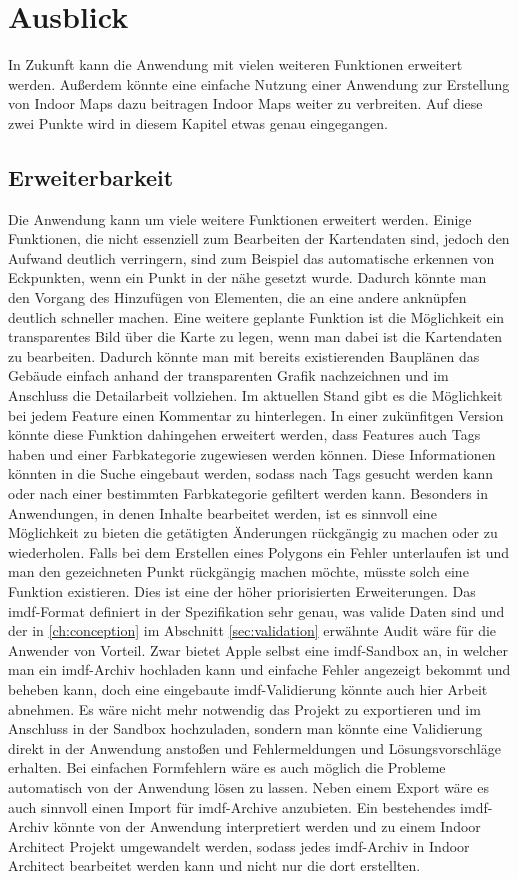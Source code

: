 \section{Ausblick}
In Zukunft kann die Anwendung mit vielen weiteren Funktionen erweitert werden.
Außerdem könnte eine einfache Nutzung einer Anwendung zur Erstellung von Indoor Maps dazu beitragen Indoor Maps weiter zu verbreiten.
Auf diese zwei Punkte wird in diesem Kapitel etwas genau eingegangen.

\subsection{Erweiterbarkeit}
Die Anwendung kann um viele weitere Funktionen erweitert werden.
Einige Funktionen, die nicht essenziell zum Bearbeiten der Kartendaten sind, jedoch den Aufwand deutlich verringern, sind zum Beispiel das automatische erkennen von Eckpunkten, wenn ein Punkt in der nähe gesetzt wurde.
Dadurch könnte man den Vorgang des Hinzufügen von Elementen, die an eine andere anknüpfen deutlich schneller machen.\pbreak
%
Eine weitere geplante Funktion ist die Möglichkeit ein transparentes Bild über die Karte zu legen, wenn man dabei ist die Kartendaten zu bearbeiten.
Dadurch könnte man mit bereits existierenden Bauplänen das Gebäude einfach anhand der transparenten Grafik nachzeichnen und im Anschluss die Detailarbeit vollziehen.\pbreak%
%
Im aktuellen Stand gibt es die Möglichkeit bei jedem Feature einen Kommentar zu hinterlegen.
In einer zukünfitgen Version könnte diese Funktion dahingehen erweitert werden, dass Features auch Tags haben und einer Farbkategorie zugewiesen werden können.
Diese Informationen könnten in die Suche eingebaut werden, sodass nach Tags gesucht werden kann oder nach einer bestimmten Farbkategorie gefiltert werden kann.\pbreak%
%
Besonders in Anwendungen, in denen Inhalte bearbeitet werden, ist es sinnvoll eine Möglichkeit zu bieten die getätigten Änderungen rückgängig zu machen oder zu wiederholen.
Falls bei dem Erstellen eines Polygons ein Fehler unterlaufen ist und man den gezeichneten Punkt rückgängig machen möchte, müsste solch eine Funktion existieren.
Dies ist eine der höher priorisierten Erweiterungen.\pbreak%
%
Das \ac{imdf}-Format definiert in der Spezifikation sehr genau, was valide Daten sind und der in \autoref{ch:conception} im Abschnitt \autoref{sec:validation} erwähnte Audit wäre für die Anwender von Vorteil.
Zwar bietet Apple selbst eine \ac{imdf}-Sandbox an, in welcher man ein \ac{imdf}-Archiv hochladen kann und einfache Fehler angezeigt bekommt und beheben kann, doch eine eingebaute \ac{imdf}-Validierung könnte auch hier Arbeit abnehmen.
Es wäre nicht mehr notwendig das Projekt zu exportieren und im Anschluss in der Sandbox hochzuladen, sondern man könnte eine Validierung direkt in der Anwendung anstoßen und Fehlermeldungen und Lösungsvorschläge erhalten.
Bei einfachen Formfehlern wäre es auch möglich die Probleme automatisch von der Anwendung lösen zu lassen.\pbreak%
%
Neben einem Export wäre es auch sinnvoll einen Import für \ac{imdf}-Archive anzubieten.
Ein bestehendes \ac{imdf}-Archiv könnte von der Anwendung interpretiert werden und zu einem Indoor Architect Projekt umgewandelt werden, sodass jedes \ac{imdf}-Archiv in Indoor Architect bearbeitet werden kann und nicht nur die dort erstellten.
